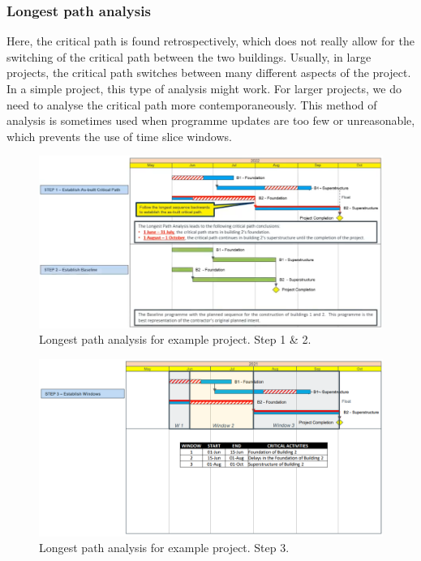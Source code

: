 \subsubsection{Longest path analysis}
Here, the critical path is found retrospectively, which does not really allow for the switching of the critical path between the two buildings. Usually, in large projects, the critical path switches between many different aspects of the project. In a simple project, this type of analysis might work. For larger projects, we do need to analyse the critical path more contemporaneously. This method of analysis is sometimes used when programme updates are too few or unreasonable, which prevents the use of time slice windows.
\begin{figure}[H]
    \centering
    \includegraphics[width = \textwidth]{img/figure41.png}
    \caption{Longest path analysis for example project. Step 1 \& 2.}
\end{figure}
\begin{figure}[H]
    \centering
    \includegraphics[width = \textwidth]{img/figure42.png}
    \caption{Longest path analysis for example project. Step 3.}
\end{figure}
